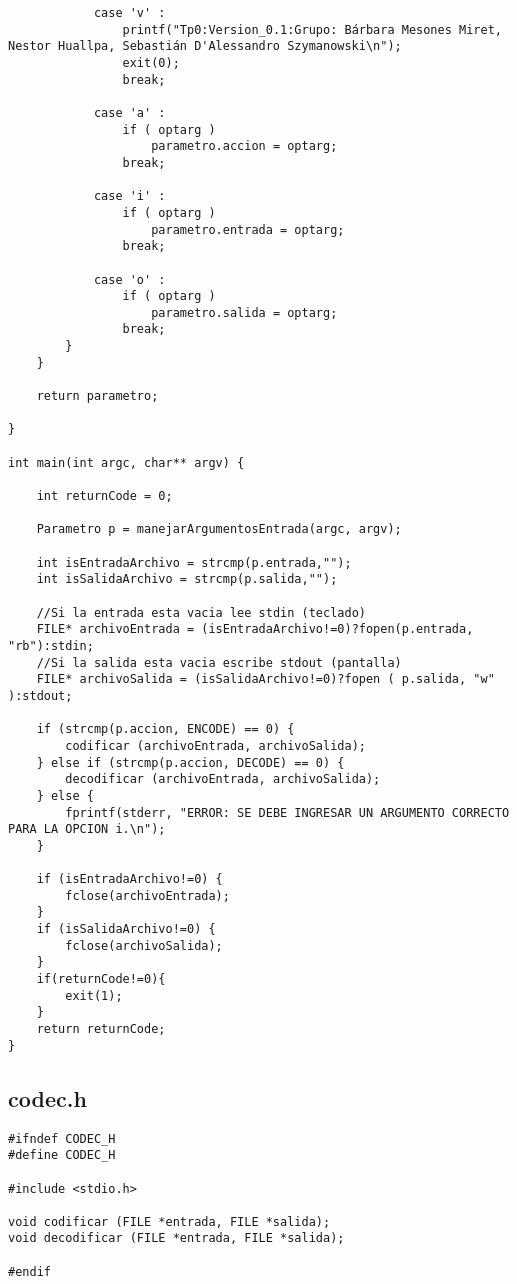 \documentclass[a4paper,11pt, margin=1in]{article}
\begin{document}
\begin{verbatim}
            case 'v' :
                printf("Tp0:Version_0.1:Grupo: Bárbara Mesones Miret, Nestor Huallpa, Sebastián D'Alessandro Szymanowski\n");
                exit(0);
            	break;
            	
            case 'a' :
                if ( optarg )
               		parametro.accion = optarg;
            	break;
            	
            case 'i' :
                if ( optarg )
					parametro.entrada = optarg;
            	break;
            	
            case 'o' :
                if ( optarg )
					parametro.salida = optarg;
            	break;
        }
    }
    
    return parametro;

}

int main(int argc, char** argv) {

	int returnCode = 0;

	Parametro p = manejarArgumentosEntrada(argc, argv);
	
	int isEntradaArchivo = strcmp(p.entrada,"");
	int isSalidaArchivo = strcmp(p.salida,"");
	
	//Si la entrada esta vacia lee stdin (teclado)
	FILE* archivoEntrada = (isEntradaArchivo!=0)?fopen(p.entrada, "rb"):stdin; 
	//Si la salida esta vacia escribe stdout (pantalla)
	FILE* archivoSalida = (isSalidaArchivo!=0)?fopen ( p.salida, "w" ):stdout; 

	if (strcmp(p.accion, ENCODE) == 0) {
		codificar (archivoEntrada, archivoSalida);
	} else if (strcmp(p.accion, DECODE) == 0) {
		decodificar (archivoEntrada, archivoSalida);
	} else {
		fprintf(stderr, "ERROR: SE DEBE INGRESAR UN ARGUMENTO CORRECTO PARA LA OPCION i.\n");
	}

	if (isEntradaArchivo!=0) {
		fclose(archivoEntrada);
	}
	if (isSalidaArchivo!=0) {
		fclose(archivoSalida);
	}
	if(returnCode!=0){ 
	 	exit(1);
	}
	return returnCode;
}
\end{verbatim}

\subsection{codec.h}


\begin{verbatim}
#ifndef CODEC_H
#define CODEC_H

#include <stdio.h>

void codificar (FILE *entrada, FILE *salida);
void decodificar (FILE *entrada, FILE *salida);

#endif
\end{verbatim}
\end{document}

